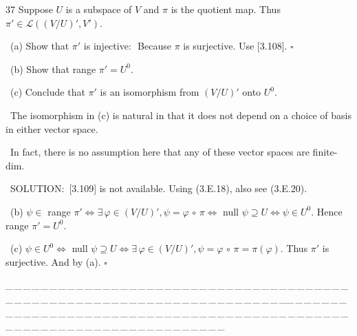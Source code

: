 \documentclass[a4paper, 11pt, UTF8]{article}
\def\Lm{\mathcal{L}}
\begin{document}
\begin{large}
{\timesbf\Large 37} {\timessl\Large Suppose $U$ is a subspace of $V$ and $\pi$ is the quotient map. Thus $\pi'\in\Lm((V/U)',V')$.}\par\quad\,
(a) {\timessl\Large Show that $\pi'$ is injective:\,\,\,\,{\large Because $\pi$ is surjective. Use [3.108]. $\square$}}\par\quad\,
(b) {\timessl\Large Show that range $\pi'=U^0$.}\par\quad\,
(c) {\timessl\Large Conclude that $\pi'$ is an isomorphism from $(V/U)'$ onto $U^0$.}\par\quad\,
{\timessl\normalsize The isomorphism in (c) is natural in that it does not depend on a choice of basis in either vector space.}\par\quad\,
{\timessl\normalsize In fact, there is no assumption here that any of these vector spaces are finite-dim.}\par\quad\,
{\timesbf S\footnotesize{OLUTION:}}\,\,\,[3.109] is not available. Using (3.E.18), also see (3.E.20).\par\quad\,
(b) $\psi\in$ range $\pi'\Longleftrightarrow\exists\,\varphi\in (V/U)',\psi=\varphi\,\circ\,\pi\Longleftrightarrow$ null $\psi\supseteq U\Longleftrightarrow \psi\in U^0$. Hence range $\pi'=U^0$.\par\quad\,
(c) $\psi\in U^0\Longleftrightarrow$ null $\psi\supseteq U\Longleftrightarrow\exists\,\varphi\in (V/U)',\psi=\varphi\,\circ\,\pi=\pi(\varphi)$. Thus $\pi'$ is surjective. And by (a). $\square$\par 
{\tiny \_\,\_\,\_\,\_\,\_\,\_\,\_\,\_\,\_\,\_\,\_\,\_\,\_\,\_\,\_\,\_\,\_\,\_\,\_\,\_\,\_\,\_\,\_\,\_\,\_\,\_\,\_\,\_\,\_\,\_\,\_\,\_\,\_\,\_\,\_\,\_\,\_\,\_\,\_\,\_\,\_\,\_\,\_\,\_\,\_\,\_\,\_\,\_\,\_\,\_\,\_\,\_\,\_\,\_\,\_\,\_\,\_\,\_\,\_\,\_\,\_\,\_\,\_\,\_\,\_\,\_\,\_\,\_\,\_\,\_\,\_\_\,\_\,\_\,\_\,\_\,\_\,\_\,\_\,\_\,\_\,\_\,\_\,\_\,\_\,\_\,\_\,\_\,\_\,\_\,\_\,\_\,\_\,\_\,\_\,\_\,\_\,\_\,\_\,\_\,\_\,\_\,\_\,\_\,\_\,\_\,\_\,\_\,\_\,\_\,\_\,\_\,\_\,\_\,\_\,\_\,\_\,\_\,\_\,\_\,\_\,\_\,\_\,\_\,\_\,\_\,\_\,\_\,\_\,\_\,\_\,\_\,\_\,\_\,\_\,\_\,\_\,\_\,\_\,\_\,\_\,\_}\par

\par{\tiny\,\par}

{\huge{}} %


\end{large}
\end{document}
